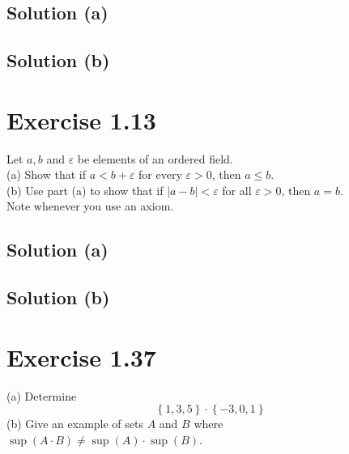 \documentclass[12pt]{report}
\begin{document}
\subsection{Solution (a)}

\subsection{Solution (b)}


\pagebreak
\section{Exercise 1.13}
Let $a, b$ and $\varepsilon$ be elements of an ordered field. \\
(a) Show that if $a < b + \varepsilon$ for every $\varepsilon > 0$, then $a \le b$. \\
(b) Use part (a) to show that if $|a - b| < \varepsilon$ for all $\varepsilon > 0$, then $a = b$. \\
Note whenever you use an axiom. 

\subsection{Solution (a)}

\subsection{Solution (b)}


\pagebreak
\section{Exercise 1.37}
(a) Determine
\[ \left\{1,3,5\right\} \cdot \left\{-3,0,1\right\} \]
(b) Give an example of sets $A$ and $B$ where $\sup(A\cdot B) \ne \sup(A) \cdot \sup(B)$.
\end{document}
